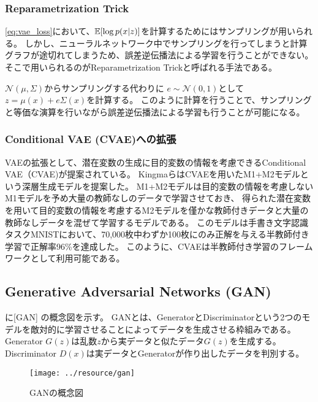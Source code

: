 \subsubsection{Reparametrization Trick} \label{reparametrization_trick}

\eqref{eq:vae_loss}において、$\operatorname{\mathbb{E}}[\log p(x|z)]$を計算するためにはサンプリングが用いられる。
しかし、ニューラルネットワーク中でサンプリングを行ってしまうと計算グラフが途切れてしまうため、誤差逆伝播法による学習を行うことができない。
そこで用いられるのがReparametrization Trickと呼ばれる手法である。

$\mathcal{N}(\mu, \Sigma)$からサンプリングする代わりに
$e\sim \mathcal{N}(0, 1)$として$z = \mu(x) + e\Sigma(x)$を計算する。
このように計算を行うことで、サンプリングと等価な演算を行いながら誤差逆伝播法による学習も行うことが可能になる。

\subsubsection{Conditional VAE (CVAE)への拡張}

VAEの拡張として、潜在変数の生成に目的変数の情報を考慮できるConditional VAE（CVAE)\cite{Kingma2014}が提案されている。
KingmaらはCVAEを用いたM1+M2モデルという深層生成モデルを提案した。
M1+M2モデルは目的変数の情報を考慮しないM1モデルを予め大量の教師なしのデータで学習させておき、
得られた潜在変数を用いて目的変数の情報を考慮するM2モデルを僅かな教師付きデータと大量の教師なしデータを混ぜて学習するモデルである。
このモデルは手書き文字認識タスクMNISTにおいて、70,000枚中わずか100枚にのみ正解を与える半教師付き学習で正解率96\%を達成した。
このように、CVAEは半教師付き学習のフレームワークとして利用可能である。

\subsection{Generative Adversarial Networks (GAN)} \label{gan}

に[GAN] \cite{gan}の概念図を示す。
GANとは、GeneratorとDiscriminatorという2つのモデルを敵対的に学習させることによってデータを生成させる枠組みである。
Generator $G(z)$は乱数$z$から実データと似たデータ$G(z)$を生成する。Discriminator $D(x)$は実データとGeneratorが作り出したデータを判別する。
\begin{figure}[tbp]
    \centering
    \texttt{[image: ../resource/gan]}
    \caption{GANの概念図} \label{fig:gan}
\end{figure}

